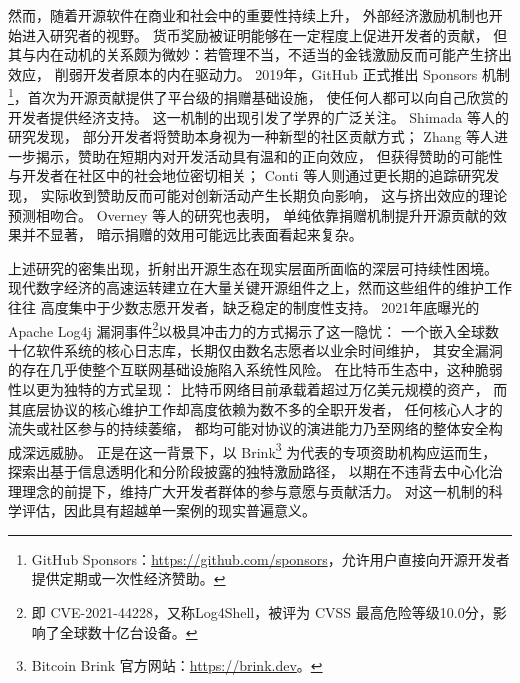 \documentclass[
    type = master, %
    degree = professional,        %
    decl-page,  %
    twoside,                %
    fontset = fandol %
  ]{njuthesis}
\begin{document}
然而，随着开源软件在商业和社会中的重要性持续上升，
外部经济激励机制也开始进入研究者的视野。
货币奖励被证明能够在一定程度上促进开发者的贡献\cite{wang2022monetary}，
但其与内在动机的关系颇为微妙：若管理不当，不适当的金钱激励反而可能产生挤出效应，
削弱开发者原本的内在驱动力\cite{benabou2003intrinsic,qiao2021mitigating}。
2019年，GitHub 正式推出 Sponsors 机制\footnote{GitHub Sponsors：\url{https://github.com/sponsors}，允许用户直接向开源开发者提供定期或一次性经济赞助。}，首次为开源贡献提供了平台级的捐赠基础设施，
使任何人都可以向自己欣赏的开发者提供经济支持。
这一机制的出现引发了学界的广泛关注。
Shimada 等人\cite{shimada2022github}的研究发现，
部分开发者将赞助本身视为一种新型的社区贡献方式；
Zhang 等人\cite{zhang2022who}进一步揭示，赞助在短期内对开发活动具有温和的正向效应，
但获得赞助的可能性与开发者在社区中的社会地位密切相关；
Conti 等人\cite{conti2023incentivizing}则通过更长期的追踪研究发现，
实际收到赞助反而可能对创新活动产生长期负向影响，
这与挤出效应的理论预测相吻合。
Overney 等人\cite{overney2020not}的研究也表明，
单纯依靠捐赠机制提升开源贡献的效果并不显著，
暗示捐赠的效用可能远比表面看起来复杂。

上述研究的密集出现，折射出开源生态在现实层面所面临的深层可持续性困境。
现代数字经济的高速运转建立在大量关键开源组件之上，然而这些组件的维护工作往往
高度集中于少数志愿开发者，缺乏稳定的制度性支持。
2021年底曝光的 Apache Log4j 漏洞事件\footnote{即 CVE-2021-44228，又称Log4Shell，被评为 CVSS 最高危险等级10.0分，影响了全球数十亿台设备。}以极具冲击力的方式揭示了这一隐忧：
一个嵌入全球数十亿软件系统的核心日志库，长期仅由数名志愿者以业余时间维护，
其安全漏洞的存在几乎使整个互联网基础设施陷入系统性风险\cite{alami2024sustainability}。
在比特币生态中，这种脆弱性以更为独特的方式呈现：
比特币网络目前承载着超过万亿美元规模的资产，
而其底层协议的核心维护工作却高度依赖为数不多的全职开发者，
任何核心人才的流失或社区参与的持续萎缩，
都均可能对协议的演进能力乃至网络的整体安全构成深远威胁。
正是在这一背景下，以 Brink\footnote{Bitcoin Brink 官方网站：\url{https://brink.dev}。} 为代表的专项资助机构应运而生，
探索出基于信息透明化和分阶段披露的独特激励路径，
以期在不违背去中心化治理理念的前提下，维持广大开发者群体的参与意愿与贡献活力\cite{wu2024governance}。
对这一机制的科学评估，因此具有超越单一案例的现实普遍意义。
\end{document}
